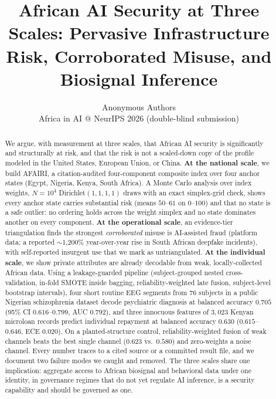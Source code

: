 \documentclass{article}
\title{African AI Security at Three Scales: Pervasive Infrastructure Risk, Corroborated Misuse, and Biosignal Inference}
\author{Anonymous Authors\\Africa in AI @ NeurIPS 2026 (double-blind submission)}
\begin{document}
\maketitle

\begin{abstract}
We argue, with measurement at three scales, that African AI security is significantly and structurally at
risk, and that the risk is not a scaled-down copy of the profile modeled in the United States, European Union,
or China. \textbf{At the national scale}, we build AFAIRI, a citation-audited four-component composite index
over four anchor states (Egypt, Nigeria, Kenya, South Africa). A Monte Carlo analysis over index weights,
$N=10^4$ Dirichlet$(1,1,1,1)$ draws with an exact simplex-grid check, shows every anchor state carries
substantial risk (means $50$--$61$ on $0$--$100$) and that no state is a safe outlier: no ordering holds across
the weight simplex and no state dominates another on every component. \textbf{At the operational scale}, an
evidence-tier triangulation finds the strongest \emph{corroborated} misuse is AI-assisted fraud (platform data;
a reported $\sim$1{,}200\% year-over-year rise in South African deepfake incidents), with self-reported
insurgent use that we mark as untriangulated. \textbf{At the individual scale}, we show private attributes are
already decodable from weak, locally-collected African data. Using a leakage-guarded pipeline (subject-grouped
nested cross-validation, in-fold SMOTE inside bagging, reliability-weighted late fusion, subject-level bootstrap
intervals), four short routine EEG segments from 76 subjects in a public Nigerian schizophrenia dataset decode
psychiatric diagnosis at balanced accuracy $0.705$ (95\% CI $0.616$--$0.799$, AUC $0.792$), and three innocuous
features of $3{,}023$ Kenyan microloan records predict individual repayment at balanced accuracy $0.630$
($0.615$--$0.646$, ECE $0.020$). On a planted-structure control, reliability-weighted fusion of weak channels
beats the best single channel ($0.623$ vs.\ $0.580$) and zero-weights a noise channel. Every number traces to a
cited source or a committed result file, and we document two failure modes we caught and removed. The three
scales share one implication: aggregate access to African biosignal and behavioral data under one identity, in
governance regimes that do not yet regulate AI inference, is a security capability and should be governed as
one.
\end{abstract}
\end{document}
